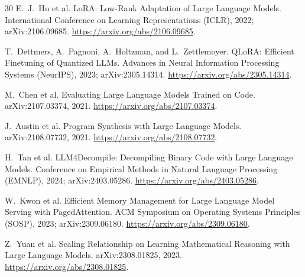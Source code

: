 \documentclass{article}
\begin{document}
\begin{thebibliography}{30}
E.~J.~Hu et al.
\newblock LoRA: Low-Rank Adaptation of Large Language Models.
\newblock International Conference on Learning Representations (ICLR), 2022; arXiv:2106.09685.
\newblock \url{https://arxiv.org/abs/2106.09685}.

T.~Dettmers, A.~Pagnoni, A.~Holtzman, and L.~Zettlemoyer.
\newblock QLoRA: Efficient Finetuning of Quantized LLMs.
\newblock Advances in Neural Information Processing Systems (NeurIPS), 2023; arXiv:2305.14314.
\newblock \url{https://arxiv.org/abs/2305.14314}.

M.~Chen et al.
\newblock Evaluating Large Language Models Trained on Code.
\newblock arXiv:2107.03374, 2021.
\newblock \url{https://arxiv.org/abs/2107.03374}.

J.~Austin et al.
\newblock Program Synthesis with Large Language Models.
\newblock arXiv:2108.07732, 2021.
\newblock \url{https://arxiv.org/abs/2108.07732}.

H.~Tan et al.
\newblock LLM4Decompile: Decompiling Binary Code with Large Language Models.
\newblock Conference on Empirical Methods in Natural Language Processing (EMNLP), 2024; arXiv:2403.05286.
\newblock \url{https://arxiv.org/abs/2403.05286}.

W.~Kwon et al.
\newblock Efficient Memory Management for Large Language Model Serving with PagedAttention.
\newblock ACM Symposium on Operating Systems Principles (SOSP), 2023; arXiv:2309.06180.
\newblock \url{https://arxiv.org/abs/2309.06180}.

Z.~Yuan et al.
\newblock Scaling Relationship on Learning Mathematical Reasoning with Large Language Models.
\newblock arXiv:2308.01825, 2023.
\newblock \url{https://arxiv.org/abs/2308.01825}.

\end{thebibliography}
\end{document}
